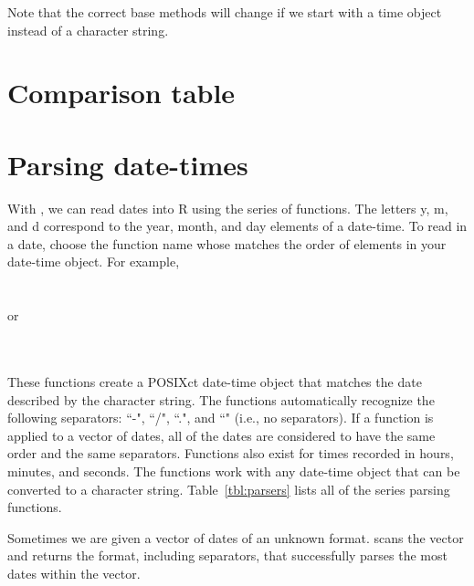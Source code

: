 \documentclass[article]{jss}
\begin{document}
Note that the correct base  methods will change if we start with a time object instead of a character string. 

\section{Comparison table}





\section{Parsing date-times}
\label{sec:parsing}

With , we can read dates into R using the  series of functions. The letters y, m, and d correspond to the year, month, and day elements of a date-time. To read in a date, choose the function name whose matches the order of elements in your date-time object. For example,\\

\\
\\

or

\\
\\


These functions create a POSIXct date-time object that matches the date described by the character string.  The functions automatically recognize the following separators: ``-", ``/", ``.", and ``" (i.e., no separators). If a  function is applied to a vector of dates, all of the dates are considered to have the same order and the same separators. Functions also exist for times recorded in hours, minutes, and seconds. The  functions work with any date-time object that can be converted to a character string. Table~\ref{tbl:parsers} lists all of the  series parsing functions.

Sometimes we are given a vector of dates of an unknown format.  scans the vector and returns the format, including separators, that successfully parses the most dates within the vector. \\
\end{document}
